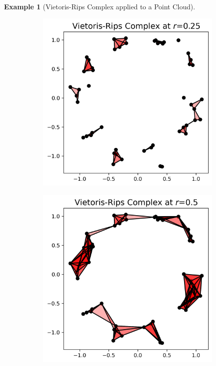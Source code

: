 \documentclass[ma]{uncgdissertationexp}
\theoremstyle{plain}
\theoremstyle{definition}
\newtheorem{example}[theorem]{Example}
\theoremstyle{remark}
\begin{document}
\begin{example}[Vietoris-Rips Complex applied to a Point Cloud]
\begin{figure}[H]
\begin{subfigure}[b]{0.22\textwidth}
        \includegraphics[width=\textwidth]{point_cloud_plot_r0_25.png}
    \end{subfigure}
        \hfill
    \begin{subfigure}[b]{0.22\textwidth}
        \centering
        \includegraphics[width=\textwidth]{point_cloud_plot_r0_5.png}

\end{subfigure}
\end{figure}
\end{example}
\end{document}

